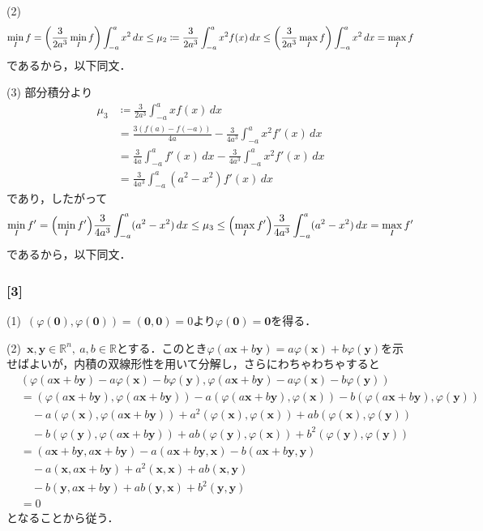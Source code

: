 \documentclass[a4j]{ltjsarticle}
\newcommand{\Rset}{\mathbb{R}}
\newcommand{\1}{\mathbbm{1}}
\numberwithin{equation}{section}
\theoremstyle{definition}
\begin{document}
(2) 
\begin{equation}
    \min_I f=\qty(\frac{3}{2a^3}\min_I f)\int_{-a}^ax^2\,dx\leq \mu_2\coloneq \frac{3}{2a^3}\int_{-a}^a x^2f(x)\,dx\leq \qty(\frac{3}{2a^3}\max_I f)\int_{-a}^ax^2\,dx=\max_I f
\end{equation}
であるから，以下同文．

(3) 部分積分より
\begin{align}
    \mu_3&\coloneq \frac{3}{2a^3}\int_{-a}^a xf(x)\,dx\\
    &=\frac{3(f(a)-f(-a))}{4a}-\frac{3}{4a^3}\int_{-a}^ax^2f'(x)\,dx\\
    &=\frac{3}{4a}\int_{-a}^af'(x)\,dx -\frac{3}{4a^3}\int_{-a}^ax^2f'(x)\,dx\\
    &=\frac{3}{4a^3}\int_{-a}^a (a^2-x^2)f'(x)\,dx 
\end{align}
であり，したがって
\begin{equation}
    \min_{I}f'=\qty(\min_I f')\frac{3}{4a^3}\int_{-a}^a(a^2-x^2)\,dx\leq \mu_3\leq \qty(\max_I f')\frac{3}{4a^3}\int_{-a}^a(a^2-x^2)\,dx=\max_I f'
\end{equation}
であるから，以下同文．
\subsubsection*{[3]}
(1)\ $(\varphi(\bm{0}),\varphi(\bm{0}))=(\bm{0},\bm{0})=0$より$\varphi(\bm{0})=\bm{0}$を得る．

(2)\ $\bm{x},\bm{y}\in \Rset^n,\ a,b\in\Rset $とする．このとき$\varphi(a\bm{x}+b\bm{y})=a\varphi(\bm{x})+b\varphi(\bm{y})$を示せばよいが，内積の双線形性を用いて分解し，さらにわちゃわちゃすると
\begin{align}
    &(\varphi(a\bm{x}+b\bm{y})-a\varphi(\bm{x})-b\varphi(\bm{y}),\varphi(a\bm{x}+b\bm{y})-a\varphi(\bm{x})-b\varphi(\bm{y}))\\
    &=(\varphi(a\bm{x}+b\bm{y}),\varphi(a\bm{x}+b\bm{y}))-a(\varphi(a\bm{x}+b\bm{y}),\varphi(\bm{x}))-b(\varphi(a\bm{x}+b\bm{y}),\varphi(\bm{y}))\\
    &\quad -a(\varphi(\bm{x}),\varphi(a\bm{x}+b\bm{y}))+a^2(\varphi(\bm{x}),\varphi(\bm{x}))+ab(\varphi(\bm{x}),\varphi(\bm{y}))\\
    &\quad -b(\varphi(\bm{y}),\varphi(a\bm{x}+b\bm{y}))+ab(\varphi(\bm{y}),\varphi(\bm{x}))+b^2(\varphi(\bm{y}),\varphi(\bm{y}))\\
    &=(a\bm{x}+b\bm{y},a\bm{x}+b\bm{y})-a(a\bm{x}+b\bm{y},\bm{x})-b(a\bm{x}+b\bm{y},\bm{y})\\
    &\quad -a(\bm{x},a\bm{x}+b\bm{y})+a^2(\bm{x},\bm{x})+ab(\bm{x},\bm{y})\\
    &\quad -b(\bm{y},a\bm{x}+b\bm{y})+ab(\bm{y},\bm{x})+b^2(\bm{y},\bm{y})\\
    &=0
\end{align}
となることから従う．
\end{document}
